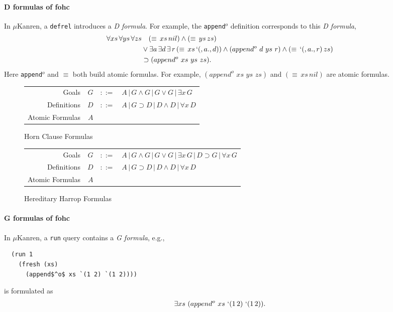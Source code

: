 \documentclass[acmlarge,review]{acmart}
\theoremstyle{definition}
\begin{document}
\paragraph{D formulas of fohc}
In $\mu$Kanren, a \texttt{defrel} introduces a \emph{D formula}.
For example, the \texttt{append$^o$} definition corresponds to this \emph{D formula},
\begin{align*}
  \forall xs\,\forall ys\,\forall zs  & \quad (\equiv\, xs\, nil) \wedge (\equiv\, ys\, zs) \\
  & \vee \exists a\,\exists d\,\exists\,r\,(\equiv\, xs\, `(,a . ,d)) \wedge (append^o\,\, d\,\, ys\,\, r) \wedge (\equiv\, `(,a . ,r)\, zs) \\
  & \supset (append^o\,\,xs\,\, ys\,\, zs).
\end{align*}
Here \texttt{append$^o$} and $\equiv$ both build atomic formulas. For example,
$(append^o\,\,xs\,\, ys\,\, zs)$ and $(\equiv\, xs\, nil)$ are atomic formulas.


\begin{figure}[!tbp]
  \begin{tabular}{r r l l}
    Goals & $G$ & $::=$ & $A\,|\,G\wedge G\,|\,G\vee G\,|\,\exists x\,G$ \hspace{3cm} \\
    Definitions & $D$ & $::=$ & $A\,|\,G \supset D\,|\,D\wedge D\,|\,\forall x\,D $\\
    Atomic Formulas & $A$ & & \\
  \end{tabular}
  \caption{Horn Clause Formulas}\label{hc}
\end{figure}

\begin{figure}[!tbp]
  \begin{tabular}{r r l l}
    Goals & $G$ & $::=$ & $A\,|\,G\wedge G\,|\,G\vee G\,|\,\exists x\,G\,|\,D\supset G\,|\,\forall x\,G$\\
    Definitions & $D$ & $::=$ & $A\,|\,G \supset D\,|\,D\wedge D\,|\,\forall x\,D $ \hspace{3cm} \\
    Atomic Formulas & $A$ & & \\
  \end{tabular}
  \caption{Hereditary Harrop Formulas}\label{hh}
\end{figure}

\paragraph{G formulas of fohc}
In $\mu$Kanren, a \texttt{run} query contains a \emph{G formula}, e.g.,
\begin{lstlisting}
  (run 1
    (fresh (xs)
      (append$^o$ xs `(1 2) `(1 2))))
\end{lstlisting}
is formulated as
\begin{align*}
  \exists xs \,\, (append^o\,\, xs\,\, `(1\, 2)\,\, `(1\, 2)).
\end{align*}
\end{document}
